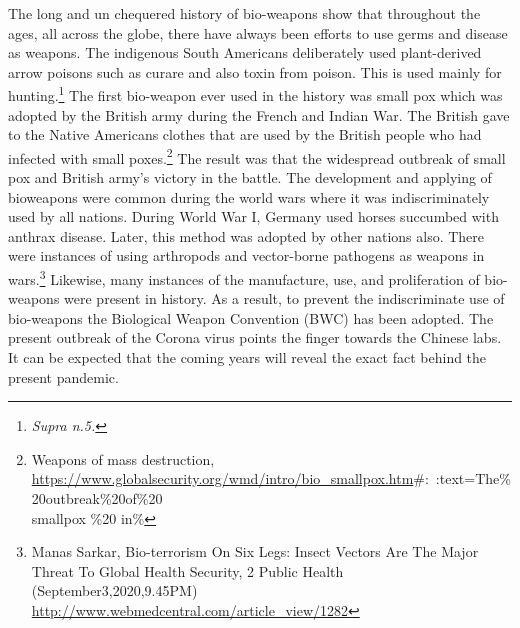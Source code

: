 \begin{multicols}{2}
\noi
The long and un chequered history of bio-weapons show that throughout the ages, all across
the globe, there have always been efforts to use germs and disease as weapons. The
indigenous South Americans deliberately used plant-derived arrow poisons such as curare
and also toxin from poison. This is used mainly for hunting.\footnote{\textit{Supra n.5.}} The first bio-weapon ever used
in the history was small pox which was adopted by the British army during the French and
Indian War. The British gave to the Native Americans clothes that are used by the British
people who had infected with small poxes.\footnote{Weapons of mass destruction,
\\\url{https://www.globalsecurity.org/wmd/intro/bio_smallpox.htm}\#:~:text=The\%20outbreak\%20of\%20\\ smallpox \%20 in\%} The result was that the widespread outbreak of
small pox and British army’s victory in the battle. The development and applying of bioweapons were common during the world wars where it was indiscriminately used by all
nations. During World War I, Germany used horses succumbed with anthrax disease. Later,
this method was adopted by other nations also. There were instances of using arthropods and 
vector-borne pathogens as weapons in wars.\footnote{Manas Sarkar, Bio-terrorism On Six Legs: Insect Vectors Are The Major Threat To Global Health Security, 2 Public Health (September3,2020,9.45PM) \url{http://www.webmedcentral.com/article_view/1282}} Likewise, many instances of the manufacture,
use, and proliferation of bio-weapons were present in history. As a result, to prevent the
indiscriminate use of bio-weapons the Biological Weapon Convention (BWC) has been
adopted. The present outbreak of the Corona virus points the finger towards the Chinese labs.
It can be expected that the coming years will reveal the exact fact behind the present
pandemic.

\vspace{-.1cm}


\end{multicols}
